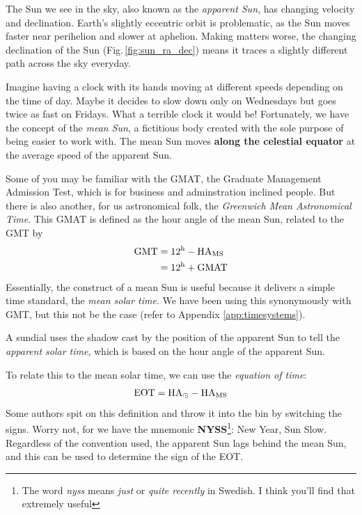 \documentclass{article}
\begin{document}
The Sun we see in the sky, also known as the \textit{apparent Sun}, has changing velocity and declination. Earth's slightly eccentric orbit is problematic, as the Sun moves faster near perihelion and slower at aphelion. Making matters worse, the changing declination of the Sun (Fig.\,\ref{fig:sun_ra_dec}) means it traces a slightly different path across the sky everyday. 

Imagine having a clock with its hands moving at different speeds depending on the time of day. Maybe it decides to slow down only on Wednesdays but goes twice as fast on Fridays. What a terrible clock it would be! Fortunately, we have the concept of the \textit{mean Sun}, a fictitious body created with the sole purpose of being easier to work with. The mean Sun moves \textbf{along the celestial equator} at the average speed of the apparent Sun.

Some of you may be familiar with the GMAT, the Graduate Management Admission Test, which is for business and adminstration inclined people. But there is also another, for us astronomical folk, the \textit{Greenwich Mean Astronomical Time}. This GMAT is defined as the hour angle of the mean Sun, related to the GMT by \begin{align}
    \mathrm{GMT} &= 12{}^\mathrm{h} - \mathrm{HA}_\mathrm{MS} \\
    &= 12{}^\mathrm{h} + \mathrm{GMAT}
\end{align}
Essentially, the construct of a mean Sun is useful because it delivers a simple time standard, the \textit{mean solar time}. We have been using this synonymously with GMT, but this not be the case (refer to Appendix \ref{app:timesystems}).

A sundial uses the shadow cast by the position of the apparent Sun to tell the \textit{apparent solar time}, which is based on the hour angle of the apparent Sun.

To relate this to the mean solar time, we can use the \textit{equation of time}:
\begin{equation}
\label{eqn:eot}
    \mathrm{EOT} = \mathrm{HA}_\odot - \mathrm{HA}_\mathrm{MS}
\end{equation}
Some authors spit on this definition and throw it into the bin by switching the signs. Worry not, for we have the mnemonic \textbf{NYSS}\footnote{The word \textit{nyss} means \textit{just} or \textit{quite recently} in Swedish. I think you'll find that extremely useful}: New Year, Sun Slow. Regardless of the convention used, the apparent Sun lags behind the mean Sun, and this can be used to determine the sign of the EOT.
\end{document}
